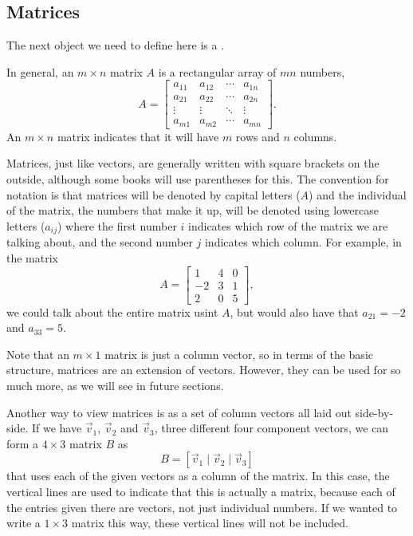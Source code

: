 \documentclass{ximera}
\begin{document}
\subsection{Matrices}

The next object we need to define here is a \emph{}. 
\begin{definition}
    In general, an $m \times n$ matrix $A$ is a rectangular array of $mn$ numbers,
    \[ 
        A = \begin{bmatrix} a_{11} & a_{12} & \cdots & a_{1n} \\
        a_{21} & a_{22} & \cdots & a_{2n} \\
        \vdots & \vdots & \ddots & \vdots \\
        a_{m1} & a_{m2} & \cdots & a_{mn}\end{bmatrix}. 
    \] 
    An $m \times n$ matrix indicates that it will have $m$ rows and $n$ columns. 
\end{definition}
Matrices, just like vectors, are generally written with square brackets on the outside, although some books will use parentheses for this. The convention for notation is that matrices will be denoted by capital letters ($A$) and the individual \emph{} of the matrix, the numbers that make it up, will be denoted using lowercase letters ($a_{ij}$) where the first number $i$ indicates which row of the matrix we are talking about, and the second number $j$ indicates which column. For example, in the matrix
\[ 
    A = \begin{bmatrix} 1 & 4 & 0 \\ -2 & 3 & 1 \\ 2 & 0 & 5 \end{bmatrix}, 
\] 
we could talk about the entire matrix usint $A$, but would also have that $a_{21} = -2$ and $a_{33} = 5$. 

Note that an $m \times 1$ matrix is just a column vector, so in terms of the basic structure, matrices are an extension of vectors. However, they can be used for so much more, as we will see in future sections. 

Another way to view matrices is as a set of column vectors all laid out side-by-side. If we have $\vec{v}_1$, $\vec{v}_2$ and $\vec{v}_3$, three different four component vectors, we can form a $4\times 3$ matrix $B$ as
\[ 
    B = \left[ \vec{v}_1 \mid \vec{v}_2 \mid \vec{v}_3 \right] 
\] 
that uses each of the given vectors as a column of the matrix. In this case, the vertical lines are used to indicate that this is actually a matrix, because each of the entries given there are vectors, not just individual numbers. If we wanted to write a $1 \times 3$ matrix this way, these vertical lines will not be included.
\end{document}
